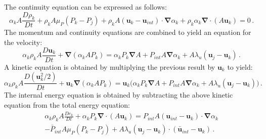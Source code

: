 \documentclass[preprint,10pt]{elsarticle}
\renewcommand{\div}{\mbold{\nabla}\! \cdot \!}
\newcommand{\grad}{\mbold{\nabla}}
\newcommand{\mbold}[1]{\boldsymbol#1}
\begin{document}
\begin{appendices}
The continuity equation can be expressed as follows:
\begin{equation}
\label{eq:cont1-app}
\alpha_k A \frac{D \rho_k}{Dt} + \rho_k A \mu_P \left( P_k-P_j \right) + \rho_k A \left( \mbold u_k-\mbold u_{int} \right) \cdot \grad \alpha_k + \rho_k \alpha_k \div \left( A \mbold u_k \right) = 0 \,.
\end{equation}
The momentum and continuity equations are combined to yield an equation for the velocity:
\begin{equation}
\label{eq:vel1-app}
\alpha_k \rho_k A \frac{D\mbold u_k}{Dt} + \grad \left( \alpha_k A P_k \right) = \alpha_k P_k \grad A + P_{int} A \grad \alpha_k + A \lambda_u \left( \mbold u_j-\mbold u_k \right) \,.
\end{equation}
A kinetic equation is obtained by multiplying the previous result by $\mbold u_k$ to yield:
\begin{equation}
\label{eq:kin1-app}
\alpha_k \rho_k A \frac{D\left(\mbold u_k^2/2\right)}{Dt} + \mbold u_k \grad \left( \alpha_k A P_k \right) = \mbold u_k  \Big( \alpha_k P_k \grad A + P_{int} A \grad \alpha_k + A \lambda_u \left( \mbold u_j-\mbold u_k \right) \Big) \,.
\end{equation}
%
The internal energy equation is obtained by subtracting the above kinetic equation from the total energy equation:
\begin{multline}\label{eq:internal1}
\alpha_k \rho_k A \frac{D e_k}{Dt} + \alpha_k P_k \div \left(A \mbold u_k \right) = 
 P_{int} A \left(\mbold u_{int}-\mbold u_k \right) \cdot \grad \alpha_k \\
 - \bar{P}_{int} A \mu_P \left(P_k-P_j \right) + A \lambda_u \left(\mbold u_j-\mbold u_k  \right) \cdot \left(\bar{\mbold u}_{int}-\mbold u_k \right) \,.
\end{multline}



\end{appendices}
\end{document}
